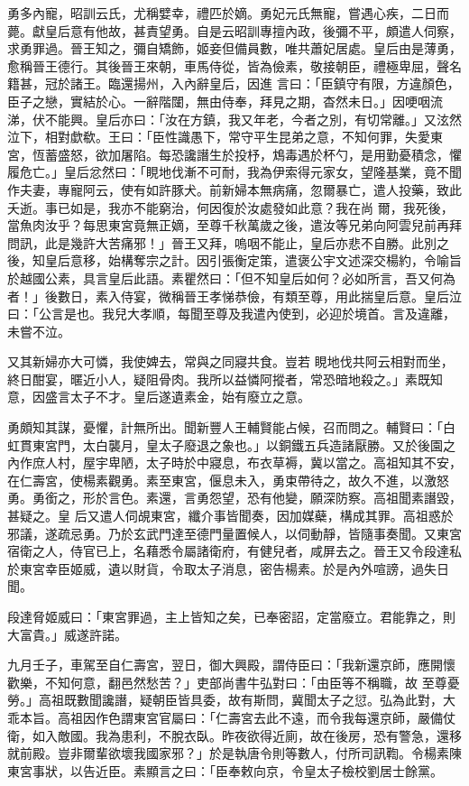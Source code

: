\begin{pinyinscope}
 勇多內寵，昭訓云氏，尤稱嬖幸，禮匹於嫡。勇妃元氏無寵，嘗遇心疾，二日而薨。獻皇后意有他故，甚責望勇。自是云昭訓專擅內政，後彌不平，頗遣人伺察，求勇罪過。晉王知之，彌自矯飾，姬妾但備員數，唯共蕭妃居處。皇后由是薄勇，愈稱晉王德行。其後晉王來朝，車馬侍從，皆為儉素，敬接朝臣，禮極卑屈，聲名籍甚，冠於諸王。臨還揚州，入內辭皇后，因進
 言曰：「臣鎮守有限，方違顏色，臣子之戀，實結於心。一辭階闥，無由侍奉，拜見之期，杳然未日。」因哽咽流涕，伏不能興。皇后亦曰：「汝在方鎮，我又年老，今者之別，有切常離。」又泫然泣下，相對歔欷。王曰：「臣性識愚下，常守平生昆弟之意，不知何罪，失愛東宮，恆蓄盛怒，欲加屠陷。每恐讒譖生於投杼，鴆毒遇於杯勺，是用勤憂積念，懼履危亡。」皇后忿然曰：「睍地伐漸不可耐，我為伊索得元家女，望隆基業，竟不聞作夫妻，專寵阿云，使有如許豚犬。前新婦本無病痛，忽爾暴亡，遣人投藥，致此夭逝。事已如是，我亦不能窮治，何因復於汝處發如此意？我在尚
 爾，我死後，當魚肉汝乎？每思東宮竟無正嫡，至尊千秋萬歲之後，遣汝等兄弟向阿雲兒前再拜問訊，此是幾許大苦痛邪！」晉王又拜，嗚咽不能止，皇后亦悲不自勝。此別之後，知皇后意移，始構奪宗之計。因引張衡定策，遣褒公宇文述深交楊約，令喻旨於越國公素，具言皇后此語。素瞿然曰：「但不知皇后如何？必如所言，吾又何為者！」後數日，素入侍宴，微稱晉王孝悌恭儉，有類至尊，用此揣皇后意。皇后泣曰：「公言是也。我兒大孝順，每聞至尊及我遣內使到，必迎於境首。言及違離，未嘗不泣。



 又其新婦亦大可憐，我使婢去，常與之同寢共食。豈若
 睍地伐共阿云相對而坐，終日酣宴，暱近小人，疑阻骨肉。我所以益憐阿摐者，常恐暗地殺之。」素既知意，因盛言太子不才。皇后遂遺素金，始有廢立之意。



 勇頗知其謀，憂懼，計無所出。聞新豐人王輔賢能占候，召而問之。輔賢曰：「白虹貫東宮門，太白襲月，皇太子廢退之象也。」以銅鐵五兵造諸厭勝。又於後園之內作庶人村，屋宇卑陋，太子時於中寢息，布衣草褥，冀以當之。高祖知其不安，在仁壽宮，使楊素觀勇。素至東宮，偃息未入，勇束帶待之，故久不進，以激怒勇。勇銜之，形於言色。素還，言勇怨望，恐有他變，願深防察。高祖聞素譖毀，甚疑之。皇
 后又遣人伺覘東宮，纖介事皆聞奏，因加媒蘗，構成其罪。高祖惑於邪議，遂疏忌勇。乃於玄武門達至德門量置候人，以伺動靜，皆隨事奏聞。又東宮宿衛之人，侍官已上，名藉悉令屬諸衛府，有健兒者，咸屏去之。晉王又令段達私於東宮幸臣姬威，遺以財貨，令取太子消息，密告楊素。於是內外喧謗，過失日聞。



 段達脅姬威曰：「東宮罪過，主上皆知之矣，已奉密詔，定當廢立。君能靠之，則大富貴。」威遂許諾。



 九月壬子，車駕至自仁壽宮，翌日，御大興殿，謂侍臣曰：「我新還京師，應開懷歡樂，不知何意，翻邑然愁苦？」吏部尚書牛弘對曰：「由臣等不稱職，故
 至尊憂勞。」高祖既數聞讒譖，疑朝臣皆具委，故有斯問，冀聞太子之愆。弘為此對，大乖本旨。高祖因作色謂東宮官屬曰：「仁壽宮去此不遠，而令我每還京師，嚴備仗衛，如入敵國。我為患利，不脫衣臥。昨夜欲得近廁，故在後房，恐有警急，還移就前殿。豈非爾輩欲壞我國家邪？」於是執唐令則等數人，付所司訊鞫。令楊素陳東宮事狀，以告近臣。素顯言之曰：「臣奉敕向京，令皇太子檢校劉居士餘黨。




\end{pinyinscope}

